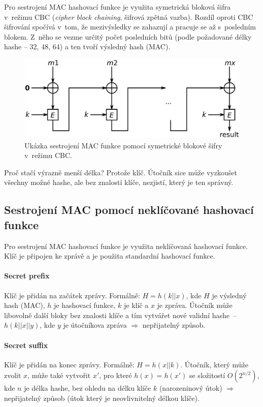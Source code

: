 Pro sestrojení MAC hashovací funkce je využita symetrická bloková šifra v~režimu CBC (\textit{cipher block chaining}, šifrová zpětná vazba). Rozdíl oproti CBC šifrování spočívá v~tom, že mezivýsledky se zahazují a pracuje se až s~posledním blokem. Z~něho se vezme určitý počet posledních bitů (podle požadované délky hashe -- 32, 48, 64) a ten tvoří výsledný hash (MAC).

\begin{figure}[H]
    \centering
    \includegraphics[width=0.8\linewidth]{mac_cbc.png}
    \caption{Ukázka sestrojení MAC funkce pomocí symetrické blokové šifry v~režimu CBC.}
\end{figure}

Proč stačí výrazně menší délka? Protože klíč. Útočník sice může vyzkoušet všechny možné hashe, ale bez znalostí klíče, nezjistí, který je ten správný.

\subsection{Sestrojení MAC pomocí neklíčované hashovací funkce}

Pro sestrojení MAC hashovací funkce je využita neklíčovaná hashovací funkce. Klíč je připojen ke zprávě a je použita standardní hashovací funkce.

\paragraph*{Secret prefix} Klíč je přidán na začátek zprávy. Formálně: $H = h(k || x)$, kde $H$ je výsledný hash (MAC), $h$ je hashovací funkce, $k$ je klíč a $x$ je zpráva. Útočník může libovolně  další bloky bez znalosti klíče a tím vytvářet nové validní hashe~--~$h(k || x || y)$, kde $y$ je útočníkova zpráva $\Rightarrow$ nepřijatelný způsob.

\paragraph*{Secret suffix} Klíč je přidán na konec zprávy. Formálně: $H = h(x || k)$. Útočník, který může zvolit $x$, může také vytvořit $x'$, pro které $h(x) = h(x')$ se složitostí $O(2^{n/2})$, kde $n$ je délka hashe, bez ohledu na délku klíče $k$ (narozeninový útok) $\Rightarrow$ nepřijatelný způsob (útok který je neovlivnitelný délkou klíče).

